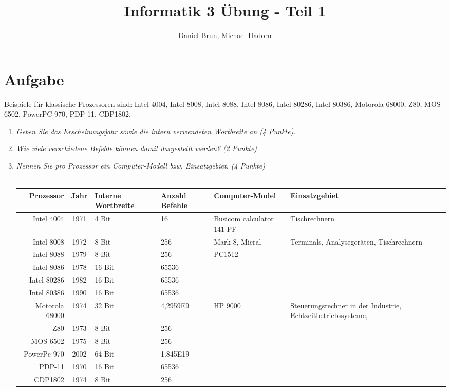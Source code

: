 \documentclass[10pt]{article}
\title{Informatik 3 Übung - Teil 1\vspace{-2ex}}
\author{Daniel Brun, Michael Hadorn\vspace{-2ex}}
\begin{document}
\maketitle

\section{Aufgabe}
Beispiele für klassische Prozessoren sind: Intel 4004, Intel 8008, Intel 8088, Intel 8086, Intel 80286, Intel 80386, Motorola 68000, Z80, MOS 6502, PowerPC 970, PDP-11, CDP1802.

\begin{enumerate}[label=\alph*)]
	\item 
	\textit{Geben Sie das Erscheinungsjahr sowie die intern verwendeten Wortbreite an (4 Punkte).}
	\item
	\textit{Wie viele verschiedene Befehle können damit dargestellt werden? (2 Punkte)}\\
	\item
	\textit{Nennen Sie pro Prozessor ein Computer-Modell bzw. Einsatzgebiet. (4 Punkte)}\\\\
	\begin{tabular}{r | c P{1.8cm} P{1.5cm} p{2cm} p{2cm} }
		Prozessor & Jahr & Interne Wortbreite & Anzahl Befehle & Computer-Model & Einsatzgebiet \\
		\hline
		Intel 4004 & 1971 & 4 Bit & 16 & Busicom calculator 141-PF & Tischrechnern \\
		Intel 8008 & 1972 & 8 Bit & 256 & Mark-8, Micral & Terminals, Analysegeräten, Tischrechnern \\
		Intel 8088 & 1979 & 8 Bit & 256  & PC1512 & \\
		Intel 8086 & 1978 & 16 Bit & 65536 & & \\
		Intel 80286 & 1982 & 16 Bit & 65536 & & \\
		Intel 80386 & 1990 & 16 Bit & 65536 & & \\
		Motorola 68000 & 1974 & 32 Bit & 4,2959E9 & HP 9000 & Steuerungsrechner in der Industrie, Echtzeitbetriebssysteme,  \\
		Z80 & 1973 & 8 Bit & 256 &  & \\
		MOS 6502 & 1975 & 8 Bit & 256 & & \\
		PowerPc 970 & 2002 & 64 Bit & 1.845E19 & & \\
		PDP-11 & 1970 & 16 Bit & 65536 & & \\
		CDP1802 & 1974 & 8 Bit & 256 & & \\
	\end{tabular}
	
\end{enumerate}
\newpage
\end{document}
